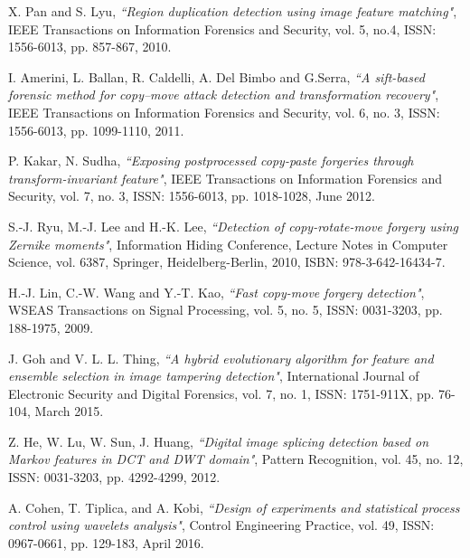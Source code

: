 X. Pan and S. Lyu,
\textit{``Region duplication detection using image feature matching"},
IEEE Transactions on Information Forensics and Security,
vol. 5, no.4, ISSN: 1556-6013, pp. 857-867, 2010.
	
I. Amerini, L. Ballan, R. Caldelli, A. Del Bimbo and G.Serra,
\textit{``A sift-based forensic method for copy–move attack detection and transformation recovery"},
IEEE Transactions on Information Forensics and Security,
vol. 6, no. 3, ISSN: 1556-6013, pp. 1099-1110, 2011.

P. Kakar, N. Sudha,
\textit{``Exposing postprocessed copy-paste forgeries through transform-invariant feature"},
IEEE Transactions on Information Forensics and Security,
vol. 7, no. 3, ISSN: 1556-6013, pp. 1018-1028, June 2012.

S.-J. Ryu, M.-J. Lee and H.-K. Lee,
\textit{``Detection of copy-rotate-move forgery using Zernike moments"},
Information Hiding Conference, Lecture Notes in Computer Science, vol. 6387, Springer,
Heidelberg-Berlin, 2010, ISBN: 978-3-642-16434-7.

H.-J. Lin, C.-W. Wang and Y.-T. Kao,
\textit{``Fast copy-move forgery detection"},
WSEAS Transactions on Signal Processing,
vol. 5, no. 5, ISSN: 0031-3203, pp. 188-1975, 2009.

J. Goh and V. L. L. Thing,
\textit{``A hybrid evolutionary algorithm for feature and ensemble selection in image tampering detection"},
International Journal of Electronic Security and Digital Forensics,
vol. 7, no. 1, ISSN: 1751-911X, pp. 76-104, March 2015.

Z. He, W. Lu, W. Sun, J. Huang,
\textit{``Digital image splicing detection based on Markov features in DCT and DWT domain"},
Pattern Recognition, vol. 45, no. 12, ISSN: 0031-3203, pp. 4292-4299, 2012.

A. Cohen, T. Tiplica, and A. Kobi,
\textit{``Design of experiments and statistical process control using wavelets analysis"},
Control Engineering Practice,
vol. 49, ISSN: 0967-0661, pp. 129-183, April 2016.